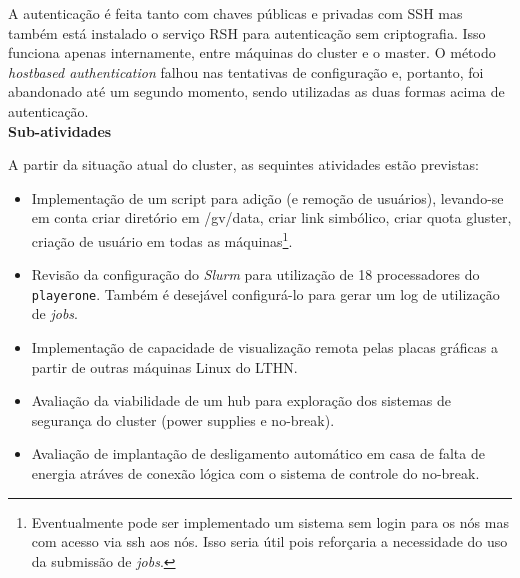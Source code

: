 A autenticação é feita tanto com chaves públicas e privadas com SSH mas também 
está instalado o serviço RSH para autenticação sem criptografia. Isso funciona 
apenas internamente, entre máquinas do cluster e o master. O método 
\textit{hostbased authentication} falhou nas tentativas de configuração e, portanto, foi abandonado até um segundo momento, sendo utilizadas as duas 
formas acima de autenticação.\\

\textbf{Sub-atividades}

A partir da situação atual do cluster, as sequintes atividades estão previstas:
\begin{itemize}
	\item[1] Implementação de um script para adição (e remoção de usuários), levando-se em conta criar diretório em /gv/data, criar link simbólico, criar quota gluster, criação de usuário em todas as máquinas\footnote{Eventualmente pode ser implementado um sistema sem login para os nós mas com acesso via ssh aos nós. Isso seria útil pois reforçaria a necessidade do uso da submissão de \textit{jobs}.}.
	\item[2] Revisão da configuração do \textit{Slurm} para utilização de 18 processadores do \texttt{playerone}. Também é desejável configurá-lo para gerar um log de utilização de \textit{jobs}.
	\item[3] Implementação de capacidade de visualização remota pelas placas gráficas a partir de outras máquinas Linux do LTHN.
	\item[4] Avaliação da viabilidade de um hub para exploração dos sistemas de segurança do cluster (power supplies e no-break).
	\item[5] Avaliação de implantação de desligamento automático em casa de falta de energia atráves de conexão lógica com o sistema de controle do no-break.
\end{itemize}

